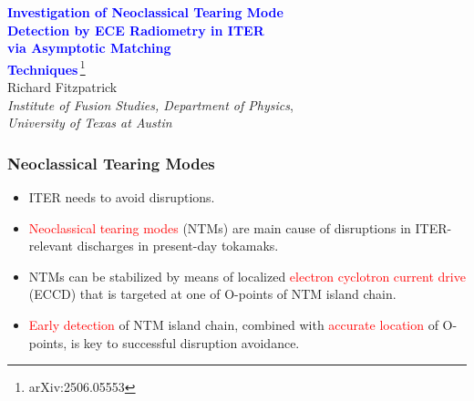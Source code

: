 \documentclass{beamer}
\newcommand{\blue}[1]{\textcolor{blue}{#1}}
\begin{document}
\begin{frame}
\begin{center}
\blue{\Large\bf Investigation of Neoclassical Tearing Mode}\\[1ex]
 \blue{\Large\bf Detection by ECE Radiometry in ITER}\\[1ex]
 \blue{\Large\bf via Asymptotic Matching}\\[1ex]
 \blue{\Large\bf Techniques}\,\footnote{arXiv:2506.05553}\\[4ex]
Richard Fitzpatrick\\[2ex]
{\em Institute of Fusion Studies, Department of Physics},\\[0.5ex] {\em University of Texas at Austin}
\vspace{4cm}
\end{center}
\end{frame}

\begin{frame}
\frametitle{Neoclassical Tearing Modes}
 
\begin{itemize}
\item ITER needs to avoid disruptions.
\item \textcolor{red}{Neoclassical tearing modes} (NTMs) are main cause of disruptions in ITER-relevant discharges in present-day tokamaks.
\item NTMs can be stabilized by means of localized \textcolor{red}{electron cyclotron current drive} (ECCD) that is targeted at one of  O-points of  NTM
island chain. 
\item \textcolor{red}{Early detection} of NTM island chain, combined with \textcolor{red}{accurate location} of O-points,  is key to successful disruption avoidance. 
\end{itemize}
\end{frame}
\end{document}
